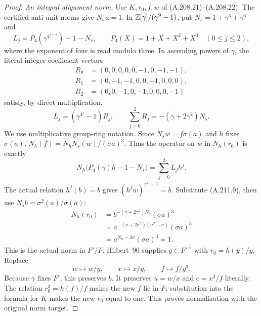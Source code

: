 \begin{proof}
\emph{An integral alignment norm.}
Use \(K,r_0,f,w\) of (A.208.21)--(A.208.22).
The certified anti-unit norms give \(N_\sigma a=1\).
In \(\mathbb Z[\gamma]/(\gamma^9-1)\), put \(N_s=1+\gamma^3+\gamma^6\) and
\[
 L_j=P_4(\gamma^{4^{j-1}})-1-N_s,\qquad
 P_4(X)=1+X+X^2+X^3\quad(0\le j\le2),
\tag{A.211.7}
\]
where the exponent of four is read modulo three.  In ascending
powers of \(\gamma\), the literal integer coefficient vectors
\[
\begin{aligned}
 R_0&=(0,0,0,0,0,-1,0,-1,-1),\\
 R_1&=(0,-1,-1,0,0,-1,0,0,0),\\
 R_2&=(0,0,-1,0,-1,0,0,0,-1)
\end{aligned}
\tag{A.211.8}
\]
satisfy, by direct multiplication,
\[
 L_j=(\gamma^{4^j}-1)R_j,\qquad
 \sum_{j=0}^2R_j=-(\gamma+2\gamma^2)N_s.
\tag{A.211.9}
\]
We use multiplicative group-ring notation.  Since
\(N_sw=f\sigma(a)\) and \(h\) fixes \(\sigma(a)\),
\(N_h(f)=N_hN_s(w)/(\sigma a)^3\).
Thus the operator on \(w\) in \(N_h(r_0)\) is exactly
\[
 N_h\bigl(P_4(\gamma)h-1-N_s\bigr)
                 =\sum_{j=0}^2L_jh^j.
\tag{A.211.10}
\]
The actual relation \(h^j(b)=b\) gives
\((h^jw)^{\gamma^{4^j}-1}=b\).
Substitute (A.211.9), then use \(N_sb=\sigma^2(a)/\sigma(a)\):
\[
\begin{aligned}
 N_h(r_0)
 &=b^{-(\gamma+2\gamma^2)N_s}(\sigma a)^3\\
 &=a^{-(\sigma+2\sigma^2)(\sigma^2-\sigma)}(\sigma a)^3\\
 &=a^{N_\sigma-3\sigma}(\sigma a)^3=1.
\end{aligned}
\tag{A.211.11}
\]
This is the actual norm in \(F'/F\).  Hilbert--90 supplies
\(y\in F'^\times\) with \(r_0=h(y)/y\).  Replace
\[
 w\mapsto w/y,\qquad x\mapsto x/y,\qquad f\mapsto f/y^3.
\tag{A.211.12}
\]
Because \(\gamma\) fixes \(F'\), this preserves \(b\).
It preserves \(u=w/x\) and \(c=x^3/f\) literally.
The relation \(r_0^3=h(f)/f\) makes the new \(f\) lie in \(F\);
substitution into the formula for \(K\) makes the new \(r_0\)
equal to one.  This proves normalization with the original norm target.


\end{proof}
